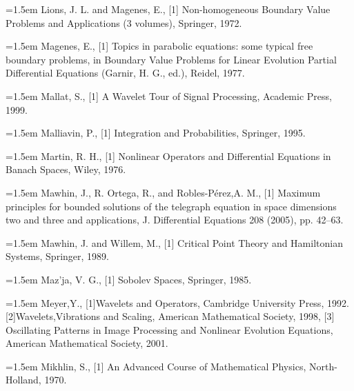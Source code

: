 \noindent\hangindent=1.5em Lions, J. L. and Magenes, E., \hypertarget{ref:LionsMagenes-1}{[1]} Non-homogeneous Boundary Value Problems and Applications (3 volumes), Springer, 1972.\par{}
\noindent\hangindent=1.5em Magenes, E., \hypertarget{ref:Magenes-1}{[1]} Topics in parabolic equations: some typical free boundary problems, in Boundary Value Problems for Linear Evolution Partial Differential Equations (Garnir, H. G., ed.), Reidel, 1977.\par{}
\noindent\hangindent=1.5em Mallat, S., \hypertarget{ref:Mallat-1}{[1]} A Wavelet Tour of Signal Processing, Academic Press, 1999.\par{}
\noindent\hangindent=1.5em Malliavin, P., \hypertarget{ref:Malliavin-1}{[1]} Integration and Probabilities, Springer, 1995.\par{}
\noindent\hangindent=1.5em Martin, R. H., \hypertarget{ref:Martin-1}{[1]} Nonlinear Operators and Differential Equations in Banach Spaces, Wiley, 1976.\par{}
\noindent\hangindent=1.5em Mawhin, J., R. Ortega, R., and Robles-Pérez,A. M., \hypertarget{ref:MawhinOrtegaRoblesPerez-1}{[1]} Maximum principles for bounded solutions of the telegraph equation in space dimensions two and three and applications, J. Differential Equations 208 (2005), pp. 42--63.\par{}
\noindent\hangindent=1.5em Mawhin, J. and Willem, M., \hypertarget{ref:MawhinWillem-1}{[1]} Critical Point Theory and Hamiltonian Systems, Springer, 1989.\par{}
\noindent\hangindent=1.5em Maz'ja, V. G., \hypertarget{ref:Mazja-1}{[1]} Sobolev Spaces, Springer, 1985.\par{}
\noindent\hangindent=1.5em Meyer,Y., \hypertarget{ref:Meyer-1}{[1]}Wavelets and Operators, Cambridge University Press, 1992. \hypertarget{ref:Meyer-2}{[2]}Wavelets,Vibrations and Scaling, American Mathematical Society, 1998, \hypertarget{ref:Meyer-3}{[3]} Oscillating Patterns in Image Processing and Nonlinear Evolution Equations, American Mathematical Society, 2001.\par{}
\noindent\hangindent=1.5em Mikhlin, S., \hypertarget{ref:Mikhlin-1}{[1]} An Advanced Course of Mathematical Physics, North-Holland, 1970.\par{}
